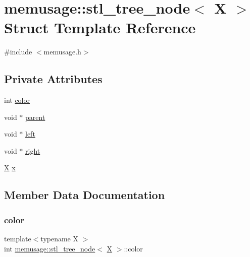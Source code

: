 \hypertarget{structmemusage_1_1stl__tree__node}{}\section{memusage\+:\+:stl\+\_\+tree\+\_\+node$<$ X $>$ Struct Template Reference}
\label{structmemusage_1_1stl__tree__node}


{\ttfamily \#include $<$memusage.\+h$>$}

\subsection*{Private Attributes}
\begin{DoxyCompactItemize}
\item 
int \mbox{\hyperlink{structmemusage_1_1stl__tree__node_adbf0a4eeb6acfcf27e4ef1ba76c0d481}{color}}
\item 
void $\ast$ \mbox{\hyperlink{structmemusage_1_1stl__tree__node_a8e6c22fbf8cc17d6d4a84710d283396a}{parent}}
\item 
void $\ast$ \mbox{\hyperlink{structmemusage_1_1stl__tree__node_a64defd9406daa36f6a35a6b2d7d356ed}{left}}
\item 
void $\ast$ \mbox{\hyperlink{structmemusage_1_1stl__tree__node_aa128a4b88bfc66f6f9d1683f08e7c803}{right}}
\item 
\mbox{\hyperlink{net_8cpp_a826edd40636cbaa44266b97c8c6a4fa3}{X}} \mbox{\hyperlink{structmemusage_1_1stl__tree__node_a7cf0173eb20148af412cf6ff8a31dc94}{x}}
\end{DoxyCompactItemize}


\subsection{Member Data Documentation}
\mbox{\label{structmemusage_1_1stl__tree__node_adbf0a4eeb6acfcf27e4ef1ba76c0d481}} 
\subsubsection{\texorpdfstring{color}{color}}
{\footnotesize\ttfamily template$<$typename X $>$ \\
int \mbox{\hyperlink{structmemusage_1_1stl__tree__node}{memusage\+::stl\+\_\+tree\+\_\+node}}$<$ \mbox{\hyperlink{net_8cpp_a826edd40636cbaa44266b97c8c6a4fa3}{X}} $>$\+::color\hspace{0.3cm}{\ttfamily [private]}}

